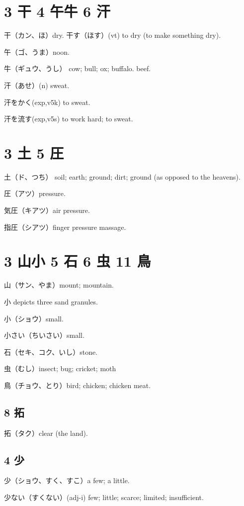\section{3 干 4 午牛 6 汗}

干（カン、ほ）dry.
干す（ほす）(vt) to dry (to make something dry).

午（ゴ、うま）noon.

牛（ギュウ、うし）
cow; bull; ox; buffalo.
beef.

汗（あせ）(n) sweat.

汗をかく(exp,v5k) to sweat.

汗を流す(exp,v5s) to work hard; to sweat.

\section{3 土 5 圧}

土（ド、つち）
soil; earth; ground; dirt; ground (as opposed to the heavens).

圧（アツ）pressure.

気圧（キアツ）air pressure.

指圧（シアツ）finger pressure massage.

\section{3 山小 5 石 6 虫 11 鳥}

山（サン、やま）mount; mountain.

小 depicts three sand granules.

小（ショウ）small.

小さい（ちいさい）small.

石（セキ、コク、いし）stone.

虫（むし）insect; bug; cricket; moth

鳥（チョウ、とり）bird; chicken; chicken meat.

\subsection{8 拓}

拓（タク）clear (the land).

\subsection{4 少}

少（ショウ、すく、すこ）a few; a little.

少ない（すくない）(adj-i) few; little; scarce; limited; insufficient.

